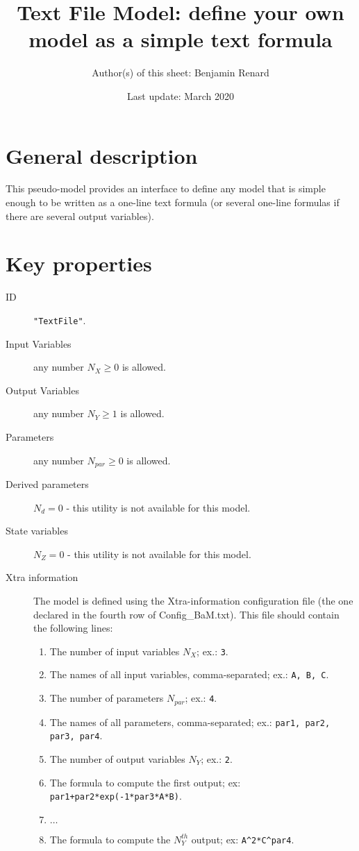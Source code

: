 \documentclass[a4paper]{article}
\title{Text File Model: define your own model as a simple text formula}
\author{Author(s) of this sheet: Benjamin Renard}
\date{Last update: March 2020}
\begin{document}
\maketitle

\section{General description}
This pseudo-model provides an interface to define any model that is simple enough to be written as a one-line text formula (or several one-line formulas if there are several output variables).

\section{Key properties}

\begin{description}
\item[ID] \texttt{"TextFile"}.

\item[Input Variables]  any number $N_X \geq0$ is allowed.

\item[Output Variables]  any number $N_Y \geq1$ is allowed.

\item[Parameters] any number $N_{par} \geq0$ is allowed.

\item[Derived parameters] $N_{d}=0$ - this utility is not available for this model.

\item[State variables] $N_{Z}=0$ - this utility is not available for this model.

\item[Xtra information] The model is defined using the Xtra-information configuration file (the one declared in the fourth row of Config\_BaM.txt). This file should contain the following lines: 
\begin{enumerate}
\item The number of input variables $N_X$; ex.: \texttt{3}.
\item The names of all input variables, comma-separated; ex.: \texttt{A, B, C}.
\item The number of parameters $N_{par}$; ex.: \texttt{4}.
\item The names of all parameters, comma-separated; ex.: \texttt{par1, par2, par3, par4}.
\item The number of output variables $N_Y$; ex.: \texttt{2}.
\item The formula to compute the first output; ex: \texttt{par1+par2*exp(-1*par3*A*B)}.
\item $\dots$
\item The formula to compute the $N_Y^{th}$ output; ex: \texttt{A\^{}2*C\^{}par4}.
\end{enumerate}
\end{description}
\end{document}
